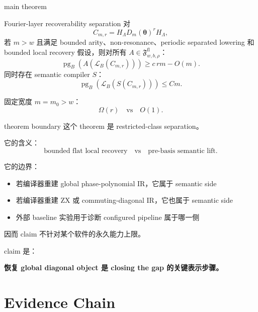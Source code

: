 \documentclass[aspectratio=169,11pt]{ctexbeamer}
\newcommand{\basis}{\mathcal{L}_B}
\newcommand{\flatclass}{\mathfrak{F}^{\mathrm{fl}}_{w,b,\rho}}
\newcommand{\pg}{\operatorname{pg}_B}
\begin{document}
\begin{frame}{main theorem}
  \begin{block}{Fourier-layer recoverability separation}
    对
    \[
      C_{m,r}=H_{\Lambda}D_m(\bm{\theta})^rH_{\Lambda},
    \]
    若 $m>w$ 且满足 bounded arity、non-resonance、periodic separated lowering 和 bounded local recovery 假设，则对所有 $A\in\flatclass$：
    \[
      \pg(A(\basis(C_{m,r})))\ge c\,rm-O(m).
    \]
    同时存在 semantic compiler $S$：
    \[
      \pg(\basis(S(C_{m,r})))\le C m.
    \]
  \end{block}

  固定宽度 $m=m_0>w$：
  \[
    \Omega(r)\quad\text{vs}\quad O(1).
  \]
\end{frame}

\begin{frame}{theorem boundary}
  这个 theorem 是 restricted-class separation。

  它的含义：
  \[
    \text{bounded flat local recovery}
    \quad\text{vs}\quad
    \text{pre-basis semantic lift}.
  \]

  它的边界：
  \begin{itemize}
    \item 若编译器重建 global phase-polynomial IR，它属于 semantic side
    \item 若编译器重建 ZX 或 commuting-diagonal IR，它也属于 semantic side
    \item 外部 baseline 实验用于诊断 configured pipeline 属于哪一侧
  \end{itemize}

  因而 claim 不针对某个软件的永久能力上限。

  claim 是：
  \begin{center}
    \textbf{恢复 global diagonal object 是 closing the gap 的关键表示步骤。}
  \end{center}
\end{frame}

\section{Evidence Chain}
\end{document}
